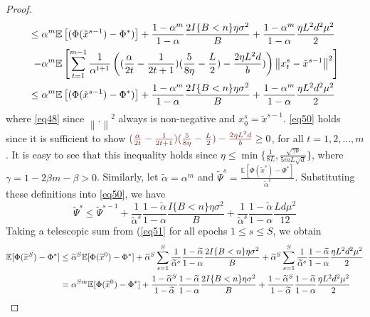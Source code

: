 \documentclass{article}
\newcommand*{\E}{\mathbb{E}}
\newcommand{\norm}[1]{\left\lVert#1\right\rVert}
\theoremstyle{definition}
\theoremstyle{remark}
\begin{document}
\begin{proof}
{\begin{align}
\leq\alpha^m\E&\left[(\Phi(\tilde{x}^{s-1}) - \Phi^*)\right] + \frac{1-\alpha^m}{1-\alpha}\frac{2I\{B < n\}\eta \sigma ^2}{B}+\frac{1-\alpha^m}{1-\alpha}\frac{\eta L^2 d^2 \mu^2}{2}\notag
\\-\alpha^m\E&\left[\sum_{t=1}^{m-1}\frac{1}{\alpha^{t+1}}\left((\frac{\alpha}{2t} - \frac{1}{2t+1})(\frac{5}{8\eta} - \frac{L}{2})-\frac{2\eta L^2 d}{b})\right) \norm{x_{t}^s-\tilde{x}^{s-1}}^2 \right]\notag\\
\leq\alpha^m\E&\left[(\Phi(\tilde{x}^{s-1}) - \Phi^*)\right] + \frac{1-\alpha^m}{1-\alpha}\frac{2I\{B < n\}\eta \sigma ^2}{B}+\frac{1-\alpha^m}{1-\alpha}\frac{\eta L^2 d^2 \mu^2}{2}\label{eq50}
\end{align}
}
where \eqref{eq48} since $\norm{.}^2$ always is non-negative and $x_0^s=\tilde{x}^{s-1}$. \eqref{eq50} holds since it is sufficient to show ${\color{Brown} (\frac{\alpha}{2t} - \frac{1}{2t+1})(\frac{5}{8\eta} - \frac{L}{2})- \frac{2\eta L^2 d}{b}} \geq 0$, for all $t=1, 2,\ldots, m$. 
It is easy to see that this inequality holds since $\eta \leq \min\{\frac{1}{8L}, \frac{\sqrt{\gamma b}}{5 m L \sqrt{d}}\}$, where $\gamma = 1-2\beta m-\beta > 0$. Similarly, let  $\tilde{\alpha} = \alpha^m$ and $\tilde{\Psi}^s = \frac{\E[\Phi(\tilde{x}^{s})-\Phi^*]}{\tilde{\alpha}^s}$. Substituting these definitions into \eqref{eq50}, we have
{\color{Brown}
\begin{equation}\label{eq51}
\widetilde{\Psi}^s \leq \widetilde{\Psi}^{s-1} + \frac{1}{\tilde{\alpha}^s} \frac{1-\tilde{\alpha}}{1-{\alpha}}\frac{I\{B < n\}\eta \sigma ^2}{B}+ \frac{1}{\tilde{\alpha}^s} \frac{1-\tilde{\alpha}}{1-{\alpha}}\frac{L d \mu^2}{12}
\end{equation}
}
Taking a telescopic sum from (\eqref{eq51} for all epochs $1 \leq s \leq S$, we obtain
{\color{Brown}
\begin{align}
\E[\Phi(\widetilde{x}^S) - {\Phi}^*] & \leq \widetilde{\alpha}^{S} \E[\Phi(\widetilde{x}^0) - {\Phi}^*] + \widetilde{\alpha}^{S} \sum_{s=1}^S \frac{1}{\widetilde{\alpha}^s}\frac{1-\widetilde{\alpha}}{1-{\alpha}}\frac{2I\{B < n\}\eta \sigma ^2}{B} + \widetilde{\alpha}^{S} \sum_{s=1}^S \frac{1}{\widetilde{\alpha}^s}\frac{1-\widetilde{\alpha}}{1-{\alpha}}\frac{\eta L^2 d^2 \mu^2}{2}\notag\\
& = {\alpha}^{Sm} \E[\Phi(\widetilde{x}^0) - {\Phi}^*] + \frac{1-\widetilde{\alpha}^S}{1-\widetilde{\alpha}}\frac{1-\widetilde{\alpha}}{1-{\alpha}}\frac{2I\{B < n\}\eta \sigma ^2}{B}+ \frac{1-\widetilde{\alpha}^S}{1-\widetilde{\alpha}}\frac{1-\widetilde{\alpha}}{1-{\alpha}}\frac{\eta L^2 d^2 \mu^2}{2}\notag\\

\end{align}}
\end{proof}
\end{document}
